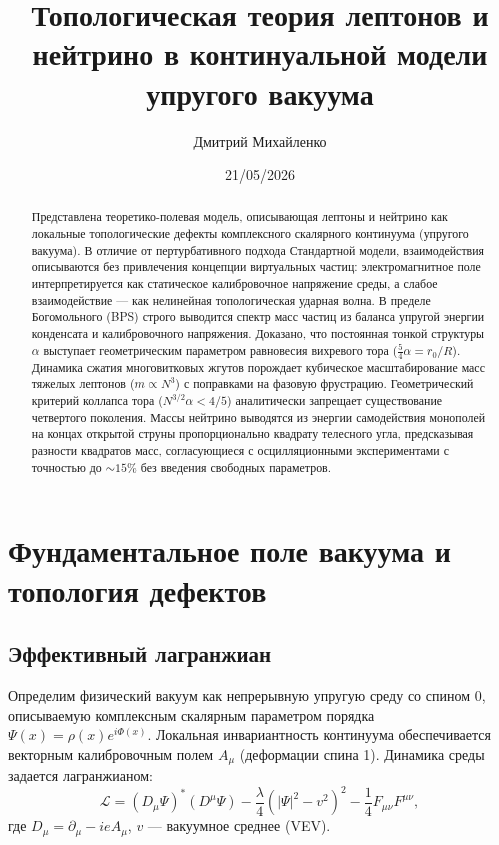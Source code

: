 \documentclass[12pt,a4paper]{article}
\title{Топологическая теория лептонов и нейтрино в континуальной модели упругого вакуума}
\author{Дмитрий Михайленко}
\date{21/05/2026}
\begin{document}
	
	\maketitle
	
	\begin{abstract}
		Представлена теоретико-полевая модель, описывающая лептоны и нейтрино как локальные топологические дефекты комплексного скалярного континуума (упругого вакуума). В отличие от пертурбативного подхода Стандартной модели, взаимодействия описываются без привлечения концепции виртуальных частиц: электромагнитное поле интерпретируется как статическое калибровочное напряжение среды, а слабое взаимодействие — как нелинейная топологическая ударная волна. В пределе Богомольного (BPS) строго выводится спектр масс частиц из баланса упругой энергии конденсата и калибровочного напряжения. Доказано, что постоянная тонкой структуры $\alpha$ выступает геометрическим параметром равновесия вихревого тора ($\frac{5}{4}\alpha = r_0/R$). Динамика сжатия многовитковых жгутов порождает кубическое масштабирование масс тяжелых лептонов ($m \propto N^3$) с поправками на фазовую фрустрацию. Геометрический критерий коллапса тора ($N^{3/2} \alpha < 4/5$) аналитически запрещает существование четвертого поколения. Массы нейтрино выводятся из энергии самодействия монополей на концах открытой струны пропорционально квадрату телесного угла, предсказывая разности квадратов масс, согласующиеся с осцилляционными экспериментами с точностью до $\sim 15\%$ без введения свободных параметров.
	\end{abstract}
	
	\section{Фундаментальное поле вакуума и топология дефектов}
	
	\subsection{Эффективный лагранжиан}
	Определим физический вакуум как непрерывную упругую среду со спином 0, описываемую комплексным скалярным параметром порядка $\Psi(x) = \rho(x) e^{i\Phi(x)}$. Локальная инвариантность континуума обеспечивается векторным калибровочным полем $A_\mu$ (деформации спина 1). Динамика среды задается лагранжианом:
	\begin{equation}
		\mathcal{L} = (D_\mu \Psi)^* (D^\mu \Psi) - \frac{\lambda}{4} \left( |\Psi|^2 - v^2 \right)^2 - \frac{1}{4} F_{\mu\nu} F^{\mu\nu},
		\label{eq:lagrangian_fundamental}
	\end{equation}
	где $D_\mu = \partial_\mu - i e A_\mu$, $v$ — вакуумное среднее (VEV).
	
\end{document}
